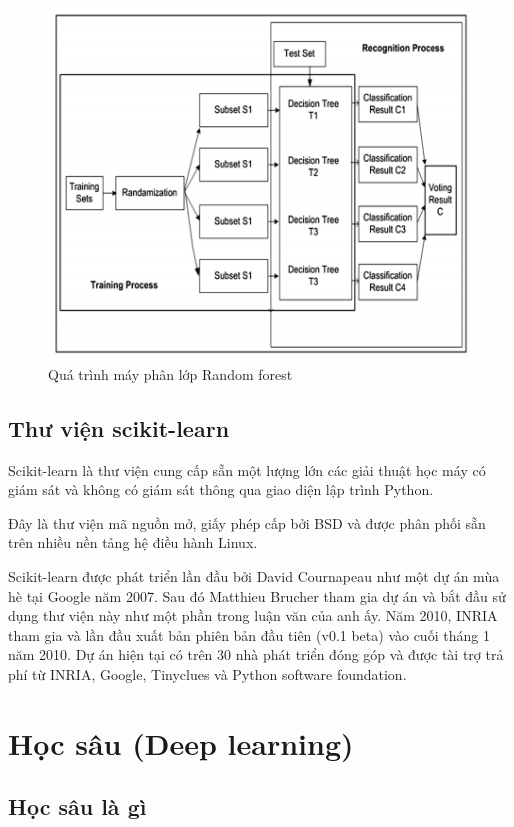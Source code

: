 \begin{figure}[ht!]
	\centering
	\includegraphics[width=0.75\linewidth]{fig/random-forest-example.png}
	\caption{Quá trình máy phân lớp  Random  forest}
	\label{fig:random-forest-example}
\end{figure}

\subsection{Thư viện scikit-learn}

Scikit-learn là thư viện cung cấp sẵn một lượng lớn các giải thuật học máy có giám sát và không có giám sát thông qua giao diện lập trình Python.

Đây là thư viện mã nguồn mở, giấy phép cấp bởi BSD và được phân phối sẵn trên nhiều nền tảng hệ điều hành Linux.

Scikit-learn được phát triển lần đầu bởi David Cournapeau như một dự án mùa hè tại Google năm 2007. Sau đó Matthieu Brucher tham gia dự án và bắt đầu sử dụng thư viện này như một phần trong luận văn của anh ấy. Năm 2010, INRIA tham gia và lần đầu xuất bản phiên bản đầu tiên (v0.1 beta) vào cuối tháng 1 năm 2010. Dự án hiện tại có trên 30 nhà phát triển đóng góp và được tài trợ trả phí từ INRIA, Google, Tinyclues và Python software foundation.

\section{Học sâu (Deep learning)}

\subsection{Học sâu là gì}

